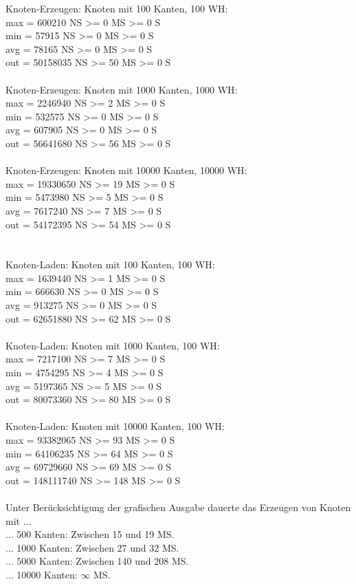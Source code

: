 \noindent
Knoten-Erzeugen: Knoten mit 100 Kanten, 100 WH:\\
max = 600210 NS >= 0 MS >= 0 S\\
min = 57915 NS >= 0 MS >= 0 S\\
avg = 78165 NS >= 0 MS >= 0 S\\
out = 50158035 NS >= 50 MS >= 0 S\\
~\\
Knoten-Erzeugen: Knoten mit 1000 Kanten, 1000 WH:\\
max = 2246940 NS >= 2 MS >= 0 S\\
min = 532575 NS >= 0 MS >= 0 S\\
avg = 607905 NS >= 0 MS >= 0 S\\
out = 56641680 NS >= 56 MS >= 0 S\\
~\\
Knoten-Erzeugen: Knoten mit 10000 Kanten, 10000 WH:\\
max = 19330650 NS >= 19 MS >= 0 S\\
min = 5473980 NS >= 5 MS >= 0 S\\
avg = 7617240 NS >= 7 MS >= 0 S\\
out = 54172395 NS >= 54 MS >= 0 S\\
~\\~\\

\noindent
Knoten-Laden: Knoten mit 100 Kanten, 100 WH:\\
max = 1639440 NS >= 1 MS >= 0 S\\
min = 666630 NS >= 0 MS >= 0 S\\
avg = 913275 NS >= 0 MS >= 0 S\\
out = 62651880 NS >= 62 MS >= 0 S\\
~\\
Knoten-Laden: Knoten mit 1000 Kanten, 100 WH:\\
max = 7217100 NS >= 7 MS >= 0 S\\
min = 4754295 NS >= 4 MS >= 0 S\\
avg = 5197365 NS >= 5 MS >= 0 S\\
out = 80073360 NS >= 80 MS >= 0 S\\
~\\
Knoten-Laden: Knoten mit 10000 Kanten, 100 WH:\\
max = 93382065 NS >= 93 MS >= 0 S\\
min = 64106235 NS >= 64 MS >= 0 S\\
avg = 69729660 NS >= 69 MS >= 0 S\\
out = 148111740 NS >= 148 MS >= 0 S\\
~\\

\noindent
Unter Berücksichtigung der grafischen Ausgabe dauerte das  Erzeugen von Knoten mit ...\\

\noindent
... 500 Kanten: Zwischen 15 und 19 MS.\\
... 1000 Kanten: Zwischen 27 und 32 MS.\\
... 5000 Kanten: Zwischen 140 und 208 MS.\\
... 10000 Kanten: $\infty$ MS.


